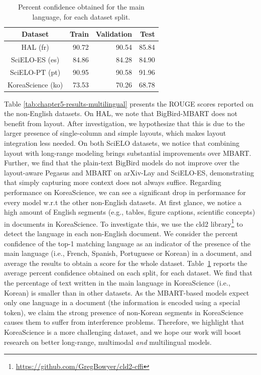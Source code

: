 \begin{table}[ht]
\centering
\small
\begin{tabular}{crrr}
\toprule
\textbf{Dataset} & \textbf{Train} & \textbf{Validation} & \textbf{Test} \\
\midrule
HAL (fr)                                 & 90.72                     & 90.54                          & 85.84                    \\
SciELO-ES (es)                            & 84.86                     & 84.28                          & 84.90                    \\
SciELO-PT (pt)                           & 90.95                     & 90.58                          & 91.96                    \\
KoreaScience (ko) & 73.53                     & 70.26                          & 68.78       \\            
\bottomrule
\end{tabular}
\caption{Percent confidence obtained for the main language, for each dataset split.}
\label{table:chapter5-percentage-main-lang}
\end{table}

Table \ref{tab:chapter5-results-multilingual} presents the ROUGE scores reported on the non-English datasets. 
On HAL, we note that BigBird-MBART does not benefit from layout. After investigation, we hypothesize that this is due to the larger presence of single-column and simple layouts, which makes layout integration less needed.
On both SciELO datasets, we notice that combining layout with long-range modeling brings substantial improvements over MBART.
Further, we find that the plain-text BigBird models do not improve over the layout-aware Pegasus and MBART on arXiv-Lay and SciELO-ES, demonstrating that simply capturing more context does not always suffice. 
Regarding performance on KoreaScience, we can see a significant drop in performance for every model w.r.t the other non-English datasets. At first glance, we notice a high amount of English segments (e.g., tables, figure captions, scientific concepts) in documents in KoreaScience. To investigate this, we use the cld2 library\footnote{\url{https://github.com/GregBowyer/cld2-cffi}} to detect the language in each non-English document. We consider the percent confidence of the top-1 matching language as an indicator of the presence of the main language (i.e., French, Spanish, Portuguese or Korean) in a document, and average the results to obtain a score for the whole dataset. Table~\ref{table:chapter5-percentage-main-lang} reports the average percent confidence obtained on each split, for each dataset. We find that the percentage of text written in the main language in KoreaScience (i.e., Korean) is smaller than in other datasets. As the MBART-based models expect only one language in a document (the information is encoded using a special token), we claim the strong presence of non-Korean segments in KoreaScience causes them to suffer from interference problems. Therefore, we highlight that KoreaScience is a more challenging dataset, and we hope our work will boost research on better long-range, multimodal \textit{and} multilingual models.

